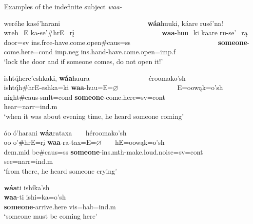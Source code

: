 \begin{exe}

\item\label{ExWAAindef} Examples of the indefinite subject \textit{waa-}

	\begin{xlist}
	
	\item \glll weréhe kasé'harani ~ ~ ~ ~ ~ ~ ~ ~ ~ ~ ~ ~ ~ ~ ~ \textbf{wáa}huuki, káare rusé'na!\\
	wreh=E ka-se'\#hrE=rį ~ ~ ~ ~ ~ ~ ~ ~ ~ ~ ~ ~ ~ ~ ~ \textbf{waa}-huu=ki kaare ru-se'=rą\\
	\textnormal{door}=sv ins.frce-\textnormal{have.come.open}\#caus=ss ~ ~ ~ ~ ~ ~ ~ ~ ~ ~ ~ ~ ~ ~ ~ \textbf{\textnormal{someone}}-\textnormal{come.here}=cond imp.neg ins.hand-\textnormal{have.come.open}=imp.f\\
	\glt `lock the door and if someone comes, do not open it!' \citep[137]{hollow1973a}

	\item \glll ishtų́here'eshkaki, \textbf{wáa}huura ~ ~ ~ ~ ~ ~ ~ ~ ~ ~ éroomako'sh\\
	ishtų́h\#hrE-eshka=ki \textbf{waa}-huu=E=$\varnothing$ ~ ~ ~ ~ ~ ~ ~ ~ ~ ~ E=oowąk=o'sh\\
	\textnormal{night}\#caus-smlt=cond \textbf{\textnormal{someone}}-\textnormal{come.here}=sv=cont ~ ~ ~ ~ ~ ~ ~ ~ ~ ~ \textnormal{hear}=narr=ind.m\\
	\glt `when it was about evening time, he heard someone coming' \citep[200]{hollow1973b}
	
	\item \glll óo ó'harani \textbf{wáa}rataxa ~ ~ héroomako'sh\\
	oo o'\#hrE=rį \textbf{waa}-ra-tax=E=$\varnothing$ ~ ~   hE=oowąk=o'sh\\
	dem.mid \textnormal{be}\#caus=ss \textbf{\textnormal{someone}}-ins.mth-\textnormal{make.loud.noise}=sv=cont ~ ~ \textnormal{see}=narr=ind.m\\
	\glt `from there, he heard someone crying' \citep[249]{hollow1973b}
	
	\item \glll \textbf{wáa}ti ishíka'sh\\
	\textbf{waa}-ti ishi=ka=o'sh\\
	\textbf{\textnormal{someone}}-\textnormal{arrive.here} vis=hab=ind.m\\
	\glt `someone must be coming here' \citep[142]{hollow1973a}

	\end{xlist}

\end{exe}

